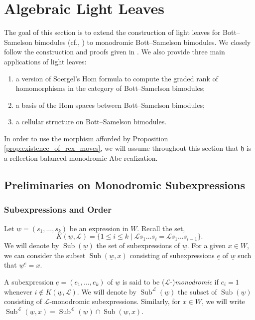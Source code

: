 \documentclass{amsart}
\newcommand{\scrL}{\mathcal{L}}
\newcommand{\fr}[1]{\mathfrak{#1}}
\DeclareMathOperator{\Subexp}{Sub}
\newcommand{\ue}{\underline{e}}
\newcommand{\uw}{\underline{w}}
\theoremstyle{definition}
\numberwithin{equation}{subsection}
\begin{document}
    \section{Algebraic Light Leaves}\label{sec:ll}


The goal of this section is to extend the construction of light leaves for Bott--Samelson bimodules (cf., \cite{Lib08, Abe19}) to monodromic Bott--Samelson bimodules. 
We closely follow the construction and proofs given in \cite{Abe19}.
We also provide three main applications of light leaves:
\begin{enumerate}
    \item a version of Soergel's Hom formula to compute the graded rank of homomorphisms in the category of Bott--Samelson bimodules;
    \item a basis of the Hom spaces between Bott--Samelson bimodules;
    \item a cellular structure on Bott--Samelson bimodules.
\end{enumerate} 

In order to use the morphism afforded by Proposition \ref{prop:existence_of_rex_moves}, we will assume throughout this section that $\fr{h}$ is a reflection-balanced monodromic Abe realization.

\subsection{Preliminaries on Monodromic Subexpressions}

\subsubsection{Subexpressions and Order}

Let $\uw = (s_1, \ldots, s_k)$ be an expression in $W$.
Recall the set,
\[K (\uw, \scrL) = \{ 1 \leq i \leq k \mid \scrL s_{1} \ldots s_i =  \scrL s_{1} \ldots s_{i-1} \}.\]
We will denote by $\Subexp (\uw)$ the set of subexpressions of $\uw$.
For a given $x \in W$, we can consider the subset $\Subexp (\uw, x)$ consisting of subexpressions $\ue$ of $\uw$ such that $\uw^{\ue} = x$.

A subexpression $\ue = (e_1, \ldots, e_k)$ of $\uw$ is said to be ($\scrL$-)\emph{monodromic} if $e_i = 1$ whenever $i \notin K (\uw, \scrL)$.
We will denote by $\Subexp^{\scrL} (\uw)$ the subset of $\Subexp (\uw)$ consisting of $\scrL$-monodromic subexpressions.
Similarly, for $x\in W$, we will write $\Subexp^{\scrL} (\uw, x) = \Subexp^{\scrL} (\uw) \cap \Subexp (\uw, x)$.
\end{document}
